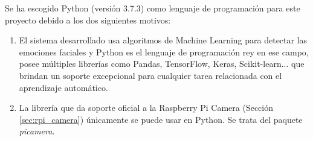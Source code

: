 Se ha escogido Python (versión 3.7.3) como lenguaje de programación para este proyecto debido a los dos siguientes motivos:

\begin{enumerate}
    \item El sistema desarrollado usa algoritmos de Machine Learning para detectar las emociones faciales y Python es el lenguaje de programación rey en ese campo, posee múltiples librerías como Pandas, TensorFlow, Keras, Scikit-learn... que brindan un soporte excepcional para cualquier tarea relacionada con el aprendizaje automático.
    
    \item La librería que da soporte oficial a la Raspberry Pi Camera (Sección \ref{sec:rpi_camera}) únicamente se puede usar en Python. Se trata del paquete \textit{picamera}.
\end{enumerate}


